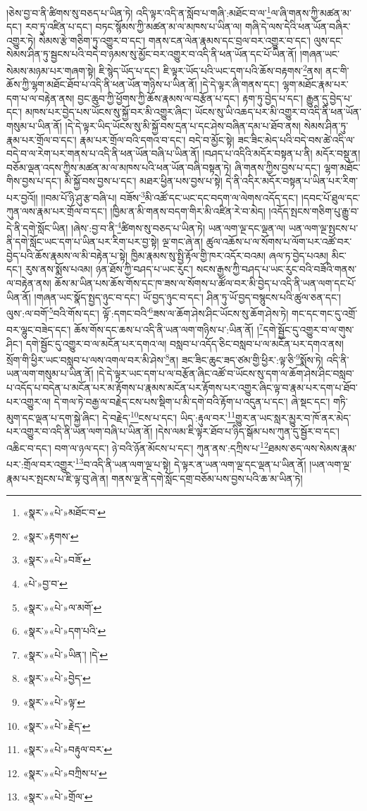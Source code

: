།ཅེས་བྱ་བ་ནི་ཚིགས་སུ་བཅད་པ་ཡིན་ཏེ། འདི་ལྟར་འདི་ན་སློབ་པ་གཞི་:མཐོང་བ་ལ་\footnote{«སྣར་»«པེ་»མཐོང་བ་}ལ་ཞི་གནས་ཀྱི་མཚན་མ་དང་། རབ་ཏུ་འཛིན་པ་དང་། བཏང་སྙོམས་ཀྱི་མཚན་མ་ལ་མཁས་པ་ཡིན་ལ། གཞི་དེ་ལས་དེའི་ཕན་ཡོན་བཞིར་འགྱུར་ཏེ། སེམས་རྩེ་གཅིག་ཏུ་འགྱུར་བ་དང་། གནས་ངན་ལེན་རྣམས་དང་བྲལ་བར་འགྱུར་བ་དང་། ལུས་དང་སེམས་ཤིན་ཏུ་སྦྱངས་པའི་བདེ་བ་ཉམས་སུ་མྱོང་བར་འགྱུར་བ་འདི་ནི་ཕན་ཡོན་དང་པོ་ཡིན་ནོ། །གཞན་ཡང་སེམས་མཉམ་པར་གཞག་སྟེ། ཇི་སྙེད་ཡོད་པ་དང་། ཇི་ལྟར་ཡོད་པའི་ཡང་དག་པའི་ཆོས་བརྟགས་\footnote{«སྣར་»རྟགས་}ནས། ནང་གི་ཆོས་ཀྱི་ལྷག་མཐོང་ཐོབ་པ་འདི་ནི་ཕན་ཡོན་གཉིས་པ་ཡིན་ནོ། །དེ་དེ་ལྟར་ཞི་གནས་དང་། ལྷག་མཐོང་རྣམ་པར་དག་པ་ལ་བརྟེན་ནས། བྱང་ཆུབ་ཀྱི་ཕྱོགས་ཀྱི་ཆོས་རྣམས་ལ་བརྩོན་པ་དང་། རྟག་ཏུ་བྱེད་པ་དང་། རྒྱུན་དུ་བྱེད་པ་དང་། མཁས་པར་བྱེད་པས་ཡོངས་སུ་སྐྱོ་བར་མི་འགྱུར་ཞིང་། ཡོངས་སུ་ཡི་འཆད་པར་མི་འགྱུར་བ་འདི་ནི་ཕན་ཡོན་གསུམ་པ་ཡིན་ནོ། །དེ་དེ་ལྟར་ཡིད་ཡོངས་སུ་མི་སྐྱོ་བས་དྲན་པ་དང་ཤེས་བཞིན་དམ་པ་ཐོབ་ནས། སེམས་ཤིན་ཏུ་རྣམ་པར་གྲོལ་བ་དང་། རྣམ་པར་གྲོལ་བའི་དགའ་བ་དང་། བདེ་བ་མྱོང་སྟེ། ཟང་ཟིང་མེད་པའི་བདེ་བས་ཚེ་འདི་ལ་བདེ་བ་ལ་རེག་པར་གནས་པ་འདི་ནི་ཕན་ཡོན་བཞི་པ་ཡིན་ནོ། །བཤད་པ་འདིའི་མདོར་བསྟན་པ་ནི། མདོར་བསྡུ་ན། བཅོམ་ལྡན་འདས་ཀྱིས་མཚན་མ་ལ་མཁས་པའི་ཕན་ཡོན་བཞི་བསྟན་ཏེ། ཞི་གནས་ཀྱིས་བྱས་པ་དང་། ལྷག་མཐོང་གིས་བྱས་པ་དང་། མི་སྐྱོ་བས་བྱས་པ་དང་། མཐར་ཕྱིན་པས་བྱས་པ་སྟེ། དེ་ནི་འདིར་མདོར་བསྟན་པ་ཡིན་པར་རིག་པར་བྱའོ།། །།བམ་པོ་ཉི་ཤུ་རྩ་བཞི་པ། བཟོས་\footnote{«སྣར་»«པེ་»བཟོ་}མི་འཚོ་དང་ཡང་དང་བདག་ལ་ལེགས་འདོད་དང་། །དབང་པོ་ཐུལ་དང་ཀུན་ལས་རྣམ་པར་གྲོལ་བ་དང་། །ཁྱིམ་ན་མི་གནས་བདག་གིར་མི་འཛིན་རེ་བ་མེད། །འདོད་སྤངས་གཅིག་པུ་རྒྱུ་བ་དེ་ནི་དགེ་སློང་ཡིན། །ཞེས་:བྱ་བ་ནི་\footnote{«པེ་»བྱ་བ་}ཚིགས་སུ་བཅད་པ་ཡིན་ཏེ། ཡན་ལག་ལྔ་དང་ལྡན་ལ། ཡན་ལག་ལྔ་སྤངས་པ་ནི་དགེ་སློང་ཡང་དག་པ་ཡིན་པར་རིག་པར་བྱ་སྟེ། ལྔ་གང་ཞེ་ན། ཚུལ་འཆོས་པ་ལ་སོགས་པ་ལོག་པར་འཚོ་བར་བྱེད་པའི་ཆོས་རྣམས་ལ་མི་བརྟེན་པ་སྟེ། ཁྱིམ་རྣམས་སུ་སྤྱི་རྟོལ་གྱི་ཁར་འདོར་བའམ། ཞལ་ཏ་བྱེད་པའམ། མིང་དང་། རུས་ནས་སྨོས་པའམ། ཉན་ཐོས་ཀྱི་བཤད་པ་ཡང་རུང་། སངས་རྒྱས་ཀྱི་བཤད་པ་ཡང་རུང་བའི་བཟོའི་གནས་ལ་བརྟེན་ནས། ཆོས་མ་ཡིན་པས་ཆོས་གོས་དང་ཁ་ཟས་ལ་སོགས་པ་ཚོལ་བར་མི་བྱེད་པ་འདི་ནི་ཡན་ལག་དང་པོ་ཡིན་ནོ། །གཞན་ཡང་སྣོད་སྤྱད་ཉུང་བ་དང་། ཡོ་བྱད་ཉུང་བ་དང་། ཤིན་ཏུ་ཡོ་བྱད་བསྙུངས་པའི་ཚུལ་ཅན་དང་། ལུས་:ལ་བགོ་\footnote{«སྣར་»«པེ་»ལ་མགོ་}བའི་གོས་དང་། ལྟོ་:དགང་བའི་\footnote{«སྣར་»«པེ་»དག་པའི་}ཟས་ལ་ཆོག་ཤེས་ཤིང་ཡོངས་སུ་ཆོག་ཤེས་ཏེ། གང་དང་གང་དུ་འགྲོ་བར་ལྷུང་བཟེད་དང་། ཆོས་གོས་དང་ཆས་པ་འདི་ནི་ཡན་ལག་གཉིས་པ་:ཡིན་ནོ། །\footnote{«སྣར་»«པེ་»ཡིན་། །དེ་}དགེ་སྦྱོང་དུ་འགྱུར་བ་ལ་གུས་ཤིང་། དགེ་སྦྱོང་དུ་འགྱུར་བ་ལ་མངོན་པར་དགའ་ལ། བསླབ་པ་འདོད་ཅིང་བསླབ་པ་ལ་མངོན་པར་དགའ་ནས། སྲོག་གི་ཕྱིར་ཡང་བསླབ་པ་ལས་འགལ་བར་མི་ཤེས་\footnote{«སྣར་»«པེ་»བྱེད་}ན། ཟང་ཟིང་ཆུང་ཟད་ཙམ་གྱི་ཕྱིར་:ལྟ་ཅི་\footnote{«སྣར་»«པེ་»ལྟ་}སྨོས་ཏེ། འདི་ནི་ཡན་ལག་གསུམ་པ་ཡིན་ནོ། །དེ་དེ་ལྟར་ཡང་དག་པ་ལ་བརྩོན་ཞིང་འཚོ་བ་ཡོངས་སུ་དག་ལ་ཆོག་ཤེས་ཤིང་བསླབ་པ་འདོད་པ་བདེན་པ་མངོན་པར་མ་རྟོགས་པ་རྣམས་མངོན་པར་རྟོགས་པར་འགྱུར་ཞིང་ལྟ་བ་རྣམ་པར་དག་པ་ཐོབ་པར་འགྱུར་ལ། དེ་གལ་ཏེ་བརྒྱ་ལ་བརྗེད་ངས་པས་སྡིག་པ་མི་དགེ་བའི་རྟོག་པ་འདུན་པ་དང་། ཞེ་སྡང་དང་། གཏི་མུག་དང་ལྡན་པ་དག་སྐྱེ་ཞིང་། དེ་བརྗེད་\footnote{«སྣར་»«པེ་»རྗེད་}ངས་པ་དང་། ཡིད་:རྟུལ་བར་\footnote{«སྣར་»«པེ་»བརྟུལ་བར་}གྱུར་ན་ཡང་སླར་མྱུར་བ་ཁོ་ནར་མེད་པར་འགྱུར་བ་འདི་ནི་ཡན་ལག་བཞི་པ་ཡིན་ནོ། །དེས་ལམ་ཇི་ལྟར་ཐོབ་པ་ཉིད་སྒོམ་པས་ཀུན་དུ་སྦྱོར་བ་དང་། འཆིང་བ་དང་། བག་ལ་ཉལ་དང་། ཉེ་བའི་ཉོན་མོངས་པ་དང་། ཀུན་ནས་:དཀྲིས་པ་\footnote{«སྣར་»«པེ་»བཀྲིས་པ་}ཐམས་ཅད་ལས་སེམས་རྣམ་པར་:གྲོལ་བར་འགྱུར་\footnote{«སྣར་»«པེ་»གྲོལ་}བ་འདི་ནི་ཡན་ལག་ལྔ་པ་སྟེ། དེ་ལྟར་ན་ཡན་ལག་ལྔ་དང་ལྡན་པ་ཡིན་ནོ། །ཡན་ལག་ལྔ་རྣམ་པར་སྤངས་པ་ཇི་ལྟ་བུ་ཞེ་ན། གནས་ལྔ་ནི་དགེ་སློང་དགྲ་བཅོམ་པས་བྱས་པའི་ཆ་མ་ཡིན་ཏེ། 